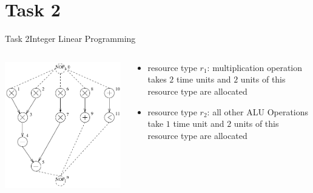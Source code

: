 
\section{Task 2}

\setcounter{task}{1}

\begin{frame}[allowframebreaks]{Task 2}{Integer Linear Programming}
  \begin{tasknoinc}
    \begin{columns}
      \begin{column}{.5\textwidth}
        \centering
        \includegraphics[height=.6\paperheight]{./figures/task2_sequence_graph.png}
      \end{column}
      \begin{column}{.5\textwidth}
        \begin{itemize}
          \item \alert{resource type $r_1$:} multiplication operation takes $2$ time units and $2$ units of this resource type are allocated
          \item \alert{resource type $r_2$:} all other ALU Operations take $1$ time unit and $2$ units of this resource type are allocated
        \end{itemize}

\end{column}
\end{columns}
\end{tasknoinc}
\end{frame}
